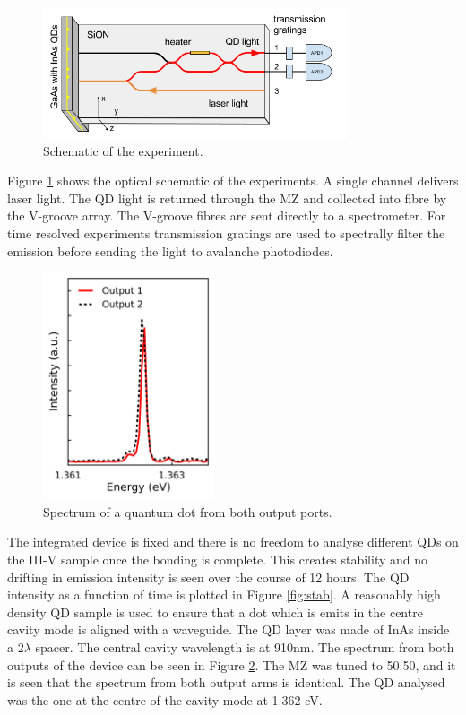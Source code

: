 \begin{figure}[h!] \begin{center}
\includegraphics[width=0.8\textwidth]{images/hyb.png} \caption{Schematic of the
experiment.} \label{fig:schem} \end{center} \end{figure}

Figure \ref{fig:schem} shows the optical schematic of the experiments. A single
channel delivers laser light. The QD light is returned through the MZ and
collected into fibre by the V-groove array. The V-groove fibres are sent
directly to a spectrometer. For time resolved experiments transmission gratings
are used to spectrally filter the emission before sending the light to avalanche
photodiodes.

\begin{figure}[h!] \begin{center}
\includegraphics[width=0.45\textwidth]{images/spec.png} \caption{Spectrum of a
quantum dot from both output ports.} \label{fig:spec} \end{center} \end{figure}

The integrated device is fixed and there is no freedom to analyse different QDs
on the III-V sample once the bonding is complete. This creates stability and no
drifting in emission intensity is seen over the course of 12 hours. The QD
intensity as a function of time is plotted in Figure \ref{fig:stab}. A
reasonably high density QD sample is used to ensure that a dot which is emits in
the centre cavity mode is aligned with a waveguide. The QD layer was made of
InAs inside a $2\lambda$ spacer. The central cavity wavelength is at 910nm. The
spectrum from both outputs of the device can be seen in Figure \ref{fig:spec}.
The MZ was tuned to 50:50, and it is seen that the spectrum from both output
arms is identical. The QD analysed was the one at the centre of the cavity mode
at 1.362 eV.

